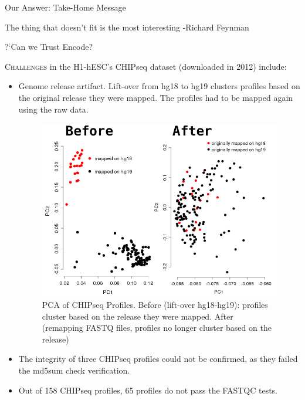 \documentclass[serif,mathserif,final]{beamer}
\begin{document}
\begin{frame}{}
\begin{columns}[t]
\begin{column}{0.32\linewidth}
\begin{block}{Our Answer: Take-Home Message}
       \begin{shadequote}
      	The thing that doesn't fit is the most interesting -Richard Feynman 	
      \end{shadequote}
        
      \end{block}
      
      \begin{block}{?`Can we Trust Encode?}
   
      \lettrine[lines=1,findent=0pt, nindent=1pt]{C}{hallenges} in the H1-hESC's CHIPseq dataset (downloaded in 2012) include:\\[10pt]
      
      \begin{itemize}
      	\item Genome release artifact. Lift-over from hg18 to hg19 clusters profiles based on the original release they were mapped. The profiles had to be mapped again using the raw data. \\[30pt]
			\begin{figure}
					\includegraphics[width=.8\textwidth]{liftover}
					\caption{PCA of CHIPseq Profiles. Before (lift-over hg18-hg19): profiles cluster based on the release they were mapped. After (remapping FASTQ files, profiles no longer cluster based on the release)}
					
					
			\end{figure}
		\item The integrity of three CHIPseq profiles could not be confirmed, as they failed the md5sum check verification.
		\item Out of 158 CHIPseq profiles, 65 profiles do not pass the FASTQC tests.
      
    
      \end{itemize}
      

\end{block}
\end{column}
\end{columns}
\end{frame}
\end{document}
